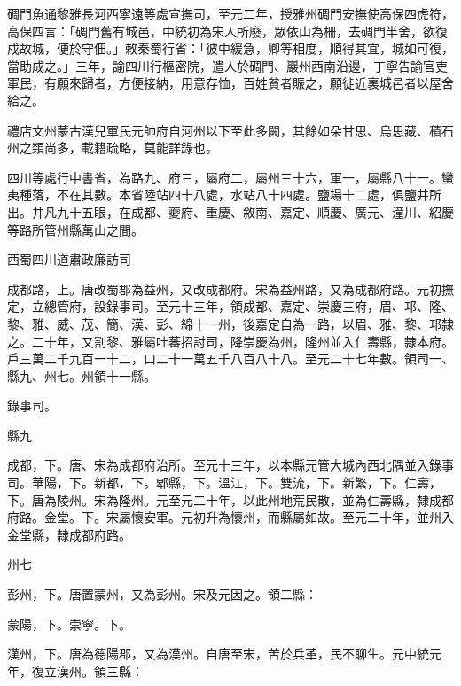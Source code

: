 \begin{pinyinscope}
 碉門魚通黎雅長河西寧遠等處宣撫司，至元二年，授雅州碉門安撫使高保四虎符，高保四言：「碉門舊有城邑，中統初為宋人所廢，眾依山為柵，去碉門半舍，欲復戍故城，便於守佃。」敕秦蜀行省：「彼中緩急，卿等相度，順得其宜，城如可復，當助成之。」三年，諭四川行樞密院，遣人於碉門、巖州西南沿邊，丁寧告諭官吏軍民，有願來歸者，方便接納，用意存恤，百姓貧者賑之，願徙近裏城邑者以屋舍給之。



 禮店文州蒙古漢兒軍民元帥府自河州以下至此多闕，其餘如朵甘思、烏思藏、積石州之類尚多，載籍疏略，莫能詳錄也。



 四川等處行中書省，為路九、府三，屬府二，屬州三十六，軍一，屬縣八十一。蠻夷種落，不在其數。本省陸站四十八處，水站八十四處。鹽場十二處，俱鹽井所出。井凡九十五眼，在成都、夔府、重慶、敘南、嘉定、順慶、廣元、潼川、紹慶等路所管州縣萬山之間。



 西蜀四川道肅政廉訪司



 成都路，上。唐改蜀郡為益州，又改成都府。宋為益州路，又為成都府路。元初撫定，立總管府，設錄事司。至元十三年，領成都、嘉定、崇慶三府，眉、邛、隆、黎、雅、威、茂、簡、漢、彭、綿十一州，後嘉定自為一路，以眉、雅、黎、邛隸之。二十年，又割黎、雅屬吐蕃招討司，降崇慶為州，隆州並入仁壽縣，隸本府。戶三萬二千九百一十二，口二十一萬五千八百八十八。至元二十七年數。領司一、縣九、州七。州領十一縣。



 錄事司。



 縣九



 成都，下。唐、宋為成都府治所。至元十三年，以本縣元管大城內西北隅並入錄事司。華陽，下。新都，下。郫縣，下。溫江，下。雙流，下。新繁，下。仁壽，下。唐為陵州。宋為隆州。元至元二十年，以此州地荒民散，並為仁壽縣，隸成都府路。金堂。下。宋屬懷安軍。元初升為懷州，而縣屬如故。至元二十年，並州入金堂縣，隸成都府路。



 州七



 彭州，下。唐置蒙州，又為彭州。宋及元因之。領二縣：



 蒙陽，下。崇寧。下。



 漢州，下。唐為德陽郡，又為漢州。自唐至宋，苦於兵革，民不聊生。元中統元年，復立漢州。領三縣：




\end{pinyinscope}
